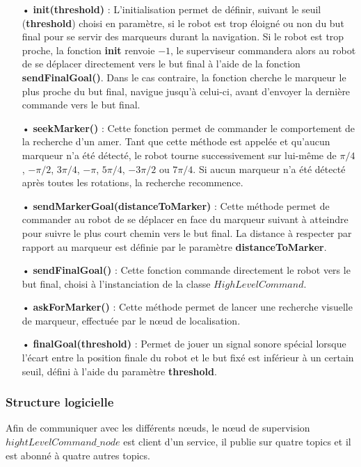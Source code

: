 \documentclass[10pt,a4paper]{article}
\begin{document}
\begin{itemize}
\item[•] \textbf{init(threshold)} : L'initialisation permet de définir, suivant le seuil (\textbf{threshold}) choisi en paramètre, si le robot est trop éloigné ou non du but final pour se servir des marqueurs durant la navigation. Si le robot est trop proche, la fonction \textbf{init} renvoie $-1$, le superviseur commandera alors au robot de se déplacer directement vers le but final à l'aide de la fonction \textbf{sendFinalGoal()}. Dans le cas contraire, la fonction cherche le marqueur le plus proche du but final, navigue jusqu'à celui-ci, avant d'envoyer la dernière commande vers le but final.
\item[•] \textbf{seekMarker()} : Cette fonction permet de commander le comportement de la recherche d'un amer. Tant que cette méthode est appelée et qu'aucun marqueur n'a été détecté, le robot tourne successivement sur lui-même de $\pi/4$, $-\pi/2$, $3\pi/4$, $-\pi$, $5\pi/4$, $-3\pi/2$ ou $7\pi/4$. Si aucun marqueur n'a été détecté après toutes les rotations, la recherche recommence.
\item[•] \textbf{sendMarkerGoal(distanceToMarker)} : Cette méthode permet de commander au robot de se déplacer en face du marqueur suivant à atteindre pour suivre le plus court chemin vers le but final. La distance à respecter par rapport au marqueur est définie par le paramètre \textbf{distanceToMarker}. 
\item[•] \textbf{sendFinalGoal()} : Cette fonction commande directement le robot vers le but final, choisi à l'instanciation de la classe $HighLevelCommand$.
\item[•] \textbf{askForMarker()} :  Cette méthode permet de lancer une recherche visuelle de marqueur, effectuée par le nœud de localisation.
\item[•] \textbf{finalGoal(threshold)} : Permet de jouer un signal sonore spécial lorsque l'écart entre la position finale du robot et le but fixé est inférieur à un certain seuil, défini à l'aide du paramètre \textbf{threshold}.
\end{itemize}

\newpage
\subsubsection{Structure logicielle}
\label{sec:StructureLogicielle}

Afin de communiquer avec les différents nœuds, le nœud de supervision $hightLevelCommand\_node$ est client d'un service, il publie sur quatre topics et il est abonné à quatre autres topics.
\end{document}
